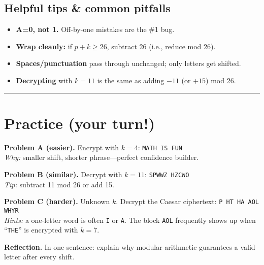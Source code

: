 \documentclass[12pt]{article}
\newcommand{\workbox}[1]{\fbox{\parbox{\dimexpr\textwidth-2\fboxsep-2\fboxrule\relax}{\vspace{#1}}}}
\begin{document}
\subsection*{Helpful tips \& common pitfalls}
\begin{itemize}[leftmargin=1.25em]
  \item \textbf{A=0, not 1.} Off-by-one mistakes are the \#1 bug.
  \item \textbf{Wrap cleanly:} if \(p+k\ge 26\), subtract 26 (i.e., reduce mod 26).
  \item \textbf{Spaces/punctuation} pass through unchanged; only letters get shifted.
  \item \textbf{Decrypting} with \(k=11\) is the same as adding \(-11\) (or \(+15\)) mod 26.
\end{itemize}

\bigskip
\hrule
\vspace{0.6em}

\section*{Practice (your turn!)}

\textbf{Problem A (easier).} Encrypt with \(k=4\): \texttt{MATH IS FUN} \\
\emph{Why:} smaller shift, shorter phrase—perfect confidence builder.
\workbox{2.0cm}

\textbf{Problem B (similar).} Decrypt with \(k=11\): \texttt{SPWWZ HZCWO} \\
\emph{Tip:} subtract 11 mod 26 or add 15.
\workbox{2.0cm}

\textbf{Problem C (harder).} Unknown \(k\). Decrypt the Caesar ciphertext: \texttt{P HT HA AOL WHYR} \\
\emph{Hints:} a one-letter word is often \texttt{I} or \texttt{A}. The block \texttt{AOL} frequently shows up when ``\texttt{THE}'' is encrypted with \(k=7\).
\workbox{2.4cm}

\bigskip
\textbf{Reflection.} In one sentence: explain why modular arithmetic guarantees a valid letter after every shift. \\
\workbox{1.2cm}
\end{document}
